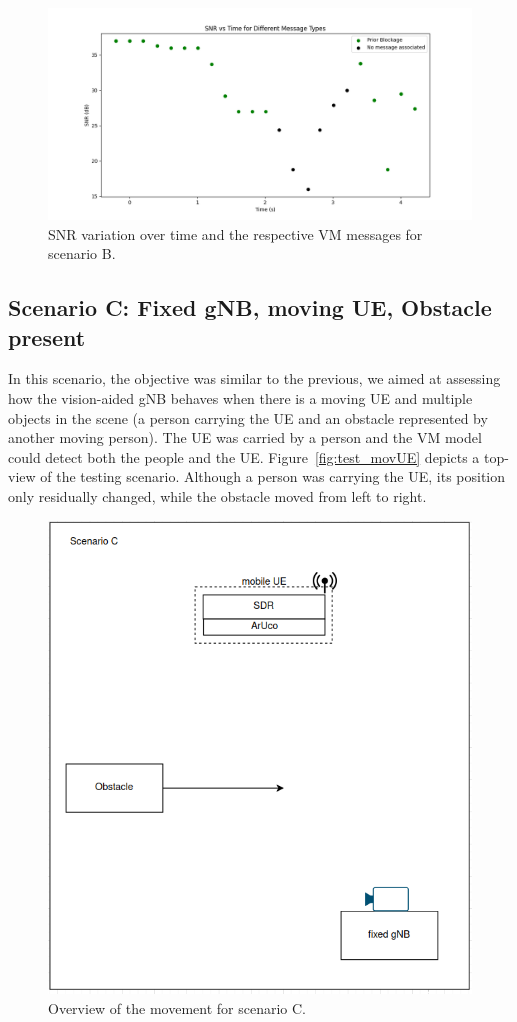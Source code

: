 \begin{figure}[H]
    \centering
    \includegraphics[width=\linewidth]{figures/results_1}
    \caption{SNR variation over time and the respective VM messages for scenario B.}
    \label{fig:results_1}
\end{figure}

\subsection{Scenario C: Fixed gNB, moving UE, Obstacle present}\label{subsec:scenario-0.1:-fixed-gnb-moving-ue-obstacle-present}

In this scenario, the objective was similar to the previous, we aimed at assessing how the vision-aided gNB behaves when there is a moving UE and multiple objects in the scene (a person carrying the UE and an obstacle represented by another moving person)\@.
The UE was carried by a person and the VM model could detect both the people and the UE\@.
Figure~\ref{fig:test_movUE} depicts a top-view of the testing scenario.
Although a person was carrying the UE, its position only residually changed, while the obstacle moved from left to right.

\begin{figure}[H]
    \centering
    \includegraphics[width=0.5\linewidth]{figures/scenario2}
    \caption{Overview of the movement for scenario C.}
    \label{fig:test_movUE_obst}
\end{figure}

